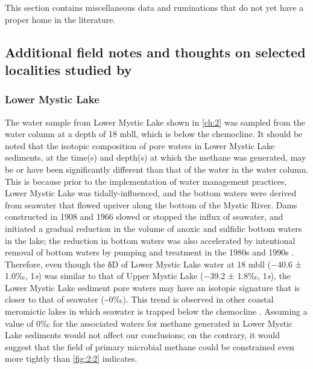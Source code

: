This section contains miscellaneous data and ruminations that do not yet have a proper home in the literature.
\clearpage 

\subsection{\texorpdfstring{Additional field notes and thoughts on selected localities studied by \textcite{Wang++_2015_S}}{Additional field notes and thoughts on selected localities studied by Wang et al.\ (2015)}}\label{field-notes-and-thoughts-on-selected-localities}

\subsubsection{Lower Mystic Lake}\label{lower-mystic-lake}

The water sample from Lower Mystic Lake shown in \autoref{ch:2} was sampled from the water column at a depth of 18 mbll,
which is below the chemocline. It should be noted that the isotopic
composition of pore waters in Lower Mystic Lake sediments, at the
time(s) and depth(s) at which the methane was generated, may be or have
been significantly different than that of the water in the water column.
This is because prior to the implementation of water management
practices, Lower Mystic Lake was tidally-influenced, and the bottom waters were derived from seawater that flowed upriver along the bottom of the Mystic
River. Dams constructed in 1908 and 1966 slowed or stopped the influx of
seawater, and initiated a gradual reduction in the volume of anoxic and
sulfidic bottom waters in the lake; the reduction in bottom waters was
also accelerated by intentional removal of bottom waters by pumping and
treatment in the 1980s and 1990s \parencite{Duval+Ludlam_2001_IRHb,Ludlam+Duval_2001_LRM}. Therefore, even though the δD of Lower Mystic Lake water
at 18 mbll ($-$40.6 ± 1.0‰, 1\emph{s}) was similar to that of Upper Mystic
Lake ($-$39.2 ± 1.8‰, 1\emph{s}), the Lower Mystic Lake sediment pore
waters may have an isotopic signature that is closer to that of seawater
(\textasciitilde{}0‰). This trend is observed in other coastal
meromictic lakes in which seawater is trapped below the chemocline
\parencite{Jeffries++_1984_CJES}. Assuming a value of 0‰ for the associated
waters for methane generated in Lower Mystic Lake sediments would not
affect our conclusions; on the contrary, it would suggest that the field
of primary microbial methane could be constrained even more tightly than
\autoref{fig:2:2} indicates.

